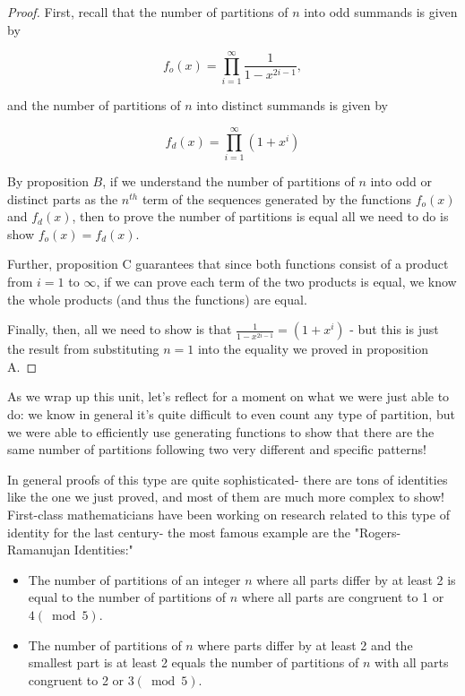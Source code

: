 \documentclass{article}
\theoremstyle{definition}
\begin{document}
\begin{proof}
First, recall that the number of partitions of $n$ into odd summands is given by

$$
f_{o}(x)=\prod_{i=1}^{\infty} \frac{1}{1-x^{2 i-1}},
$$

and the number of partitions of $n$ into distinct summands is given by

$$
f_{d}(x)=\prod_{i=1}^{\infty}\left(1+x^{i}\right)
$$

By proposition $B$, if we understand the number of partitions of $n$ into odd or distinct parts as the $n^{t h}$ term of the sequences generated by the functions $f_{o}(x)$ and $f_{d}(x)$, then to prove the number of partitions is equal all we need to do is show $f_{o}(x)=f_{d}(x)$.

Further, proposition C guarantees that since both functions consist of a product from $i=1$ to $\infty$, if we can prove each term of the two products is equal, we know the whole products (and thus the functions) are equal.

Finally, then, all we need to show is that $\frac{1}{1-x^{2 i-1}}=\left(1+x^{i}\right)$ - but this is just the result from substituting $n=1$ into the equality we proved in proposition A.
\end{proof}

As we wrap up this unit, let's reflect for a moment on what we were just able to do: we know in general it's quite difficult to even count any type of partition, but we were able to efficiently use generating functions to show that there are the same number of partitions following two very different and specific patterns!

In general proofs of this type are quite sophisticated- there are tons of identities like the one we just proved, and most of them are much more complex to show! First-class mathematicians have been working on research related to this type of identity for the last century- the most famous example are the "Rogers-Ramanujan Identities:"

\begin{itemize}
  \item The number of partitions of an integer $n$ where all parts differ by at least 2 is equal to the number of partitions of $n$ where all parts are congruent to 1 or $4(\bmod 5)$.
  \item The number of partitions of $n$ where parts differ by at least 2 and the smallest part is at least 2 equals the number of partitions of $n$ with all parts congruent to 2 or $3(\bmod 5)$.
\end{itemize}
\end{document}
